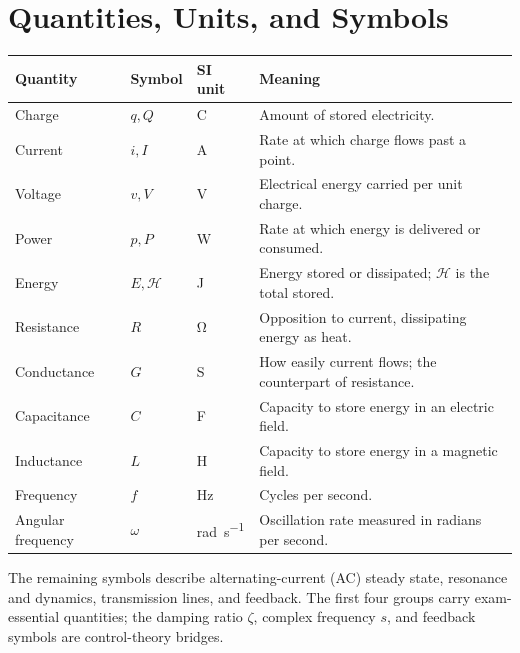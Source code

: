 \section{Quantities, Units, and Symbols}
\begin{tabularx}{\textwidth}{@{}L{0.19\textwidth}L{0.13\textwidth}L{0.16\textwidth}Y@{}}
\toprule
Quantity & Symbol & SI unit & Meaning \\
\midrule
Charge & \(q,Q\) & \si{\coulomb} & Amount of stored electricity. \\
Current & \(i,I\) & \si{\ampere} & Rate at which charge flows past a point. \\
Voltage & \(v,V\) & \si{\volt} & Electrical energy carried per unit charge. \\
Power & \(p,P\) & \si{\watt} & Rate at which energy is delivered or consumed. \\
Energy & \(E,\mathcal{H}\) & \si{\joule} & Energy stored or dissipated; \(\mathcal{H}\) is the total stored. \\
Resistance & \(R\) & \si{\ohm} & Opposition to current, dissipating energy as heat. \\
Conductance & \(G\) & \si{\siemens} & How easily current flows; the counterpart of resistance. \\
Capacitance & \(C\) & \si{\farad} & Capacity to store energy in an electric field. \\
Inductance & \(L\) & \si{\henry} & Capacity to store energy in a magnetic field. \\
Frequency & \(f\) & \si{\hertz} & Cycles per second. \\
Angular frequency & \(\omega\) & \si{\radian\per\second} & Oscillation rate measured in radians per second. \\
\bottomrule
\end{tabularx}

The remaining symbols describe alternating-current (AC) steady state, resonance
and dynamics,
transmission lines, and feedback. The first four groups carry exam-essential
quantities; the damping ratio \(\zeta\), complex frequency \(s\), and feedback
symbols are control-theory bridges.

